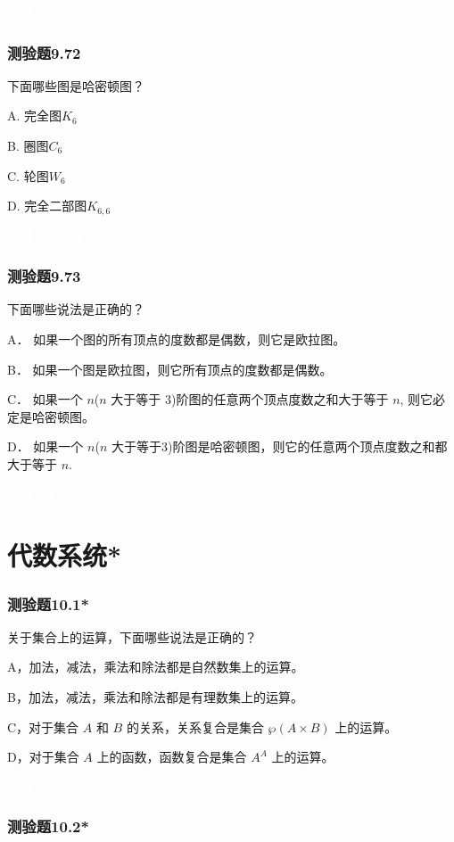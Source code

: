 \documentclass[UTF8, heading=true]{ctexart}
\begin{document}
\textcolor{white}{答案：D}

\subsubsection{测验题9.72}

下面哪些图是哈密顿图？

A. 完全图$K_6$

B. 圈图$C_6$

C. 轮图$W_6$

D. 完全二部图$K_{6,6}$

\textcolor{white}{答案：ABCD}

\subsubsection{测验题9.73}

下面哪些说法是正确的？

A．
如果一个图的所有顶点的度数都是偶数，则它是欧拉图。

B．
如果一个图是欧拉图，则它所有顶点的度数都是偶数。

C．
如果一个 $n$($n$ 大于等于 3)阶图的任意两个顶点度数之和大于等于 $n$, 则它必定是哈密顿图。

D．
如果一个 $n$($n$ 大于等于3)阶图是哈密顿图，则它的任意两个顶点度数之和都大于等于 $n$.

\textcolor{white}{答案：B}

\clearpage

\section{代数系统*}

\subsubsection{测验题10.1*}

关于集合上的运算，下面哪些说法是正确的？

A，加法，减法，乘法和除法都是自然数集上的运算。

B，加法，减法，乘法和除法都是有理数集上的运算。

C，对于集合 $A$ 和 $B$ 的关系，关系复合是集合 $\wp(A \times B)$ 上的运算。

D，对于集合 $A$ 上的函数，函数复合是集合 $A^A$ 上的运算。

\textcolor{white}{答案：BD}

\subsubsection{测验题10.2*}
\end{document}
